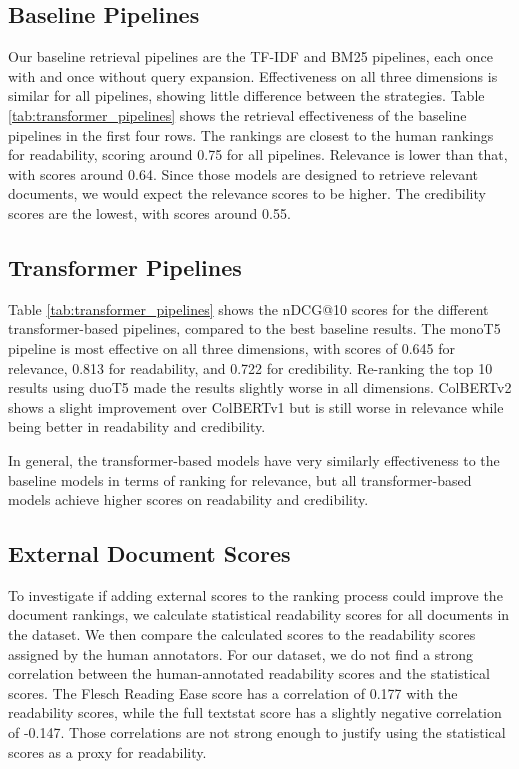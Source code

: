 \subsection{Baseline Pipelines}
Our baseline retrieval pipelines are the TF-IDF and BM25 pipelines, each once with and once without query expansion.
Effectiveness on all three dimensions is similar for all pipelines, showing little difference between the strategies.
Table \ref{tab:transformer_pipelines} shows the retrieval effectiveness of the baseline pipelines in the first four rows.
The rankings are closest to the human rankings for readability, scoring around 0.75 for all pipelines.
Relevance is lower than that, with scores around 0.64.
Since those models are designed to retrieve relevant documents, we would expect the relevance scores to be higher.
The credibility scores are the lowest, with scores around 0.55.

\subsection{Transformer Pipelines}
Table \ref{tab:transformer_pipelines} shows the nDCG@10 scores for the different transformer-based pipelines, compared to the best baseline results.
The monoT5 pipeline is most effective on all three dimensions, with scores of 0.645 for relevance, 0.813 for readability, and 0.722 for credibility.
Re-ranking the top 10 results using duoT5 made the results slightly worse in all dimensions.
ColBERTv2 shows a slight improvement over ColBERTv1 but is still worse in relevance while being better in readability and credibility.

In general, the transformer-based models have very similarly effectiveness to the baseline models in terms of ranking for relevance, but all transformer-based models achieve higher scores on readability and credibility.

\subsection{External Document Scores}
To investigate if adding external scores to the ranking process could improve the document rankings, we calculate statistical readability scores for all documents in the dataset.
We then compare the calculated scores to the readability scores assigned by the human annotators.
For our dataset, we do not find a strong correlation between the human-annotated readability scores and the statistical scores.
The Flesch Reading Ease score has a correlation of 0.177 with the readability scores, while the full textstat score has a slightly negative correlation of -0.147.
Those correlations are not strong enough to justify using the statistical scores as a proxy for readability.

